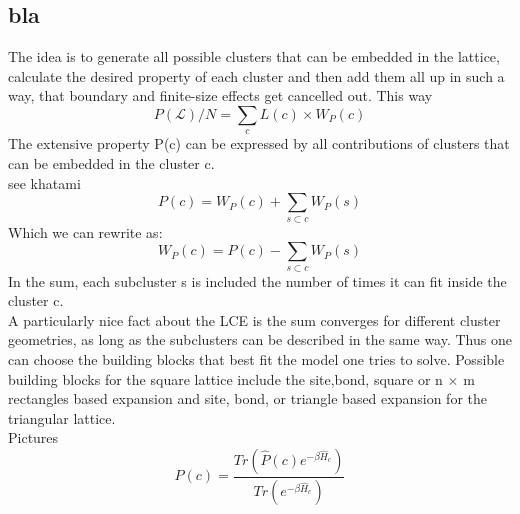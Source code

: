 \documentclass{article}
\begin{document}
\subsection{bla}
The idea is to generate all possible clusters that can be embedded in
the lattice, calculate the desired property of each cluster and then
add them all up in such a way, that boundary and finite-size effects
get cancelled out. This way
\begin{equation}
\label{eq:3}
P(\mathcal{L})/N = \sum\limits_c L(c) \times W_P(c)
\end{equation}
The extensive property P(c) can be expressed by all contributions of
clusters that can be embedded in the cluster c.\\
see khatami\\
\begin{equation}
\label{eq:9}
P(c) = W_P(c) + \sum\limits_{s \subset c} W_P(s)
\end{equation}
Which we can rewrite as:
\begin{equation}
\label{eq:4}
W_P(c) = P(c) - \sum\limits_{s \subset c} W_P(s)
\end{equation}
In the sum, each subcluster s is included the number of times it can
fit inside the cluster c.\\
A particularly nice fact about the LCE is the sum converges for
different cluster geometries, as long as the subclusters can be
described in the same way. Thus one can choose the
building blocks that best fit the model one tries to solve. Possible building blocks for the square
lattice include the site,bond, square or n
$\times$ m rectangles based expansion and site, bond, or triangle
based expansion for the triangular lattice.\\
Pictures\\
\begin{equation}
\label{eq:6}
P(c) = \frac{Tr \left(\hat P(c) e^{-\beta \hat H_c} \right)}{Tr
  \left(e^{-\beta \hat H_c} \right)}
\end{equation}
\end{document}
